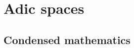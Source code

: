     \chapter{Adic spaces}
        \begin{abstract}
            
        \end{abstract}
        
        \minitoc
        
        
        
    \begin{appendices}
        \chapter{Condensed mathematics}
            \begin{abstract}
            
            \end{abstract}
            
            \minitoc
        
            
            
            
            
            
    \end{appendices}
	
	\printbibliography

